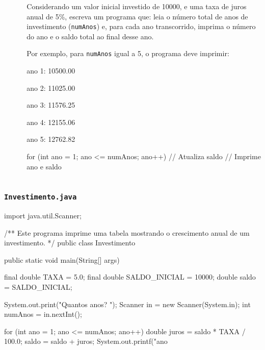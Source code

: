\documentclass[xcolor={dvipsnames,table},aspectratio=169]{beamer}
\begin{document}
\begin{frame}[fragile]
\begin{columns}[T]
\begin{column}{0.3\linewidth}
\begin{figure}[h]
\end{figure}
	\end{column}
	\begin{column}{0.7\linewidth}
	\begin{itemize}
        {\footnotesize
		\item Considerando um valor inicial investido de 10000, e uma taxa de juros anual de 5\%, escreva um programa que: leia o número total de anos de investimento (\texttt{numAnos}) e, para cada ano transcorrido, imprima o número do ano e o saldo total ao final desse ano.
		\item Por exemplo, para \texttt{numAnos} igual a 5, o programa deve imprimir:
		}
		\begin{itemize}
            {\scriptsize
			\item ano 1: 10500.00
			\item ano 2: 11025.00
			\item ano 3: 11576.25
			\item ano 4: 12155.06
			\item ano 5: 12762.82\\
			}
		\end{itemize}
	\end{itemize}
{\scriptsize
\begin{javacode}
for (int ano = 1; ano <= numAnos; ano++) {
   // Atualiza saldo
   // Imprime ano e saldo
}
\end{javacode}
}
	\end{column}
\end{columns}
\end{frame}

\begin{frame}[fragile]\frametitle{\texttt{Investimento.java}}
{\tiny
\begin{javacode}
import java.util.Scanner;

/**
   Este programa imprime uma tabela mostrando o crescimento anual de um investimento.
*/
public class Investimento {
   public static void main(String[] args) {
      final double TAXA = 5.0;
      final double SALDO_INICIAL = 10000;
      double saldo = SALDO_INICIAL;

      System.out.print("Quantos anos? ");
      Scanner in = new Scanner(System.in);
      int numAnos = in.nextInt();

      for (int ano = 1; ano <= numAnos; ano++) {
         double juros = saldo * TAXA / 100.0;
         saldo = saldo + juros;
         System.out.printf("ano %
      }
   }
}
\end{javacode}
}
\end{frame}
\end{document}

